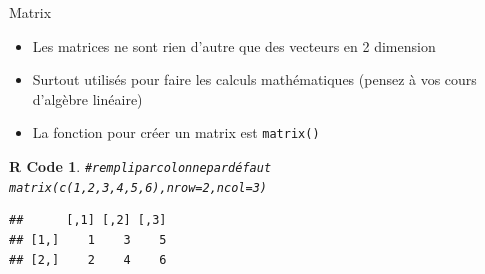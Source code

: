 \documentclass[11pt]{beamer}\usepackage[]{graphicx}\usepackage[]{color}
\makeatletter
\newcommand{\hlnum}[1]{\textcolor[rgb]{0.063,0.58,0.627}{#1}}%
\newcommand{\hlcom}[1]{\textcolor[rgb]{0.588,0.588,0.588}{#1}}%
\newcommand{\hlstd}[1]{\textcolor[rgb]{0.196,0.196,0.196}{#1}}%
\newcommand{\hlkwc}[1]{\textcolor[rgb]{0,0.631,0.314}{#1}}%
\newcommand{\hlkwd}[1]{\textcolor[rgb]{0.78,0.227,0.412}{#1}}%
\newenvironment{kframe}{%
 \def\at@end@of@kframe{}%
 \ifinner\ifhmode%
  \def\at@end@of@kframe{\end{minipage}}%
  \begin{minipage}{\columnwidth}%
 \fi\fi%
 \def\FrameCommand##1{\hskip\@totalleftmargin \hskip-\fboxsep
 \colorbox{shadecolor}{##1}\hskip-\fboxsep
     \hskip-\linewidth \hskip-\@totalleftmargin \hskip\columnwidth}%
 \MakeFramed {\advance\hsize-\width
   \@totalleftmargin\z@ \linewidth\hsize
   \@setminipage}}%
 {\par\unskip\endMakeFramed%
 \at@end@of@kframe}
\newenvironment{knitrout}{}{} %
\newtheorem{rcode}{R Code}[section]
\newcommand{\code}[1]{\texttt{#1}}
\makeatother
\begin{document}

\begin{frame}[fragile]{Matrix}

\begin{itemize}
  \setlength\itemsep{1em}
\item Les matrices ne sont rien d'autre que des vecteurs en 2 dimension
\pause \item Surtout utilisés pour faire les calculs mathématiques (pensez à vos cours d'algèbre linéaire)
\pause \item La fonction pour créer un matrix est \code{matrix()}
\end{itemize}
\pause
\begin{knitrout}
\color{fgcolor}\begin{kframe}
\begin{rcode}\begin{alltt}
\hlcom{# rempli par colonne par défaut}
\hlkwd{matrix}\hlstd{(}\hlkwd{c}\hlstd{(}\hlnum{1}\hlstd{,}\hlnum{2}\hlstd{,}\hlnum{3}\hlstd{,}\hlnum{4}\hlstd{,}\hlnum{5}\hlstd{,}\hlnum{6}\hlstd{),} \hlkwc{nrow} \hlstd{=} \hlnum{2}\hlstd{,} \hlkwc{ncol} \hlstd{=} \hlnum{3}\hlstd{)}
\end{alltt}
\begin{verbatim}
##      [,1] [,2] [,3]
## [1,]    1    3    5
## [2,]    2    4    6
\end{verbatim}
\end{rcode}\end{kframe}
\end{knitrout}

\end{frame}
\end{document}
